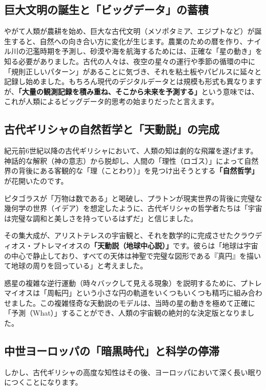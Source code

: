 \subsection{巨大文明の誕生と「ビッグデータ」の蓄積}

やがて人類が農耕を始め、巨大な古代文明（メソポタミア、エジプトなど）が誕生すると、自然への向き合い方に変化が生じます。農業のための暦を作り、ナイル川の氾濫時期を予測し、砂漠や海を航海するためには、正確な「星の動き」を知る必要がありました。古代の人々は、夜空の星々の運行や季節の循環の中に「規則正しいパターン」があることに気づき、それを粘土板やパピルスに延々と記録し始めました。もちろん現代のデジタルデータとは規模も形式も異なりますが、\textbf{「大量の観測記録を積み重ね、そこから未来を予測する」}という意味では、これが人類によるビッグデータ的思考の始まりだったと言えます。

\subsection{古代ギリシャの自然哲学と「天動説」の完成}

紀元前6世紀以降の古代ギリシャにおいて、人類の知は劇的な飛躍を遂げます。神話的な解釈（神の意志）から脱却し、人間の「理性（ロゴス）」によって自然界の背後にある客観的な「理（ことわり）」を見つけ出そうとする\textbf{「自然哲学」}が花開いたのです。

ピタゴラスが「万物は数である」と喝破し、プラトンが現実世界の背後に完璧な幾何学の世界（イデア）を想定したように、古代ギリシャの哲学者たちは「宇宙は完璧な調和と美しさを持っているはずだ」と信じました。

その集大成が、アリストテレスの宇宙観と、それを数学的に完成させたクラウディオス・プトレマイオスの\textbf{「天動説（地球中心説）」}です。彼らは「地球は宇宙の中心で静止しており、すべての天体は神聖で完璧な図形である『真円』を描いて地球の周りを回っている」と考えました。

惑星の複雑な逆行運動（時々バックして見える現象）を説明するために、プトレマイオスは「周転円」という小さな円の軌道をいくつもいくつも精巧に組み合わせました。この複雑怪奇な天動説のモデルは、当時の星の動きを極めて正確に「予測（What）」することができ、人類の宇宙観の絶対的な決定版となりました。

\subsection{中世ヨーロッパの「暗黒時代」と科学の停滞}

しかし、古代ギリシャの高度な知性はその後、ヨーロッパにおいて深く長い眠りにつくことになります。

